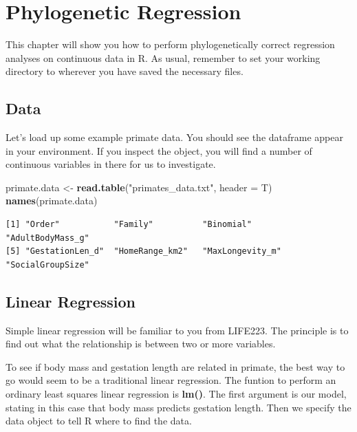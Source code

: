 \documentclass[
]{book}
\newenvironment{Shaded}{\begin{snugshade}}{\end{snugshade}}
\newcommand{\DataTypeTok}[1]{\textcolor[rgb]{0.13,0.29,0.53}{#1}}
\newcommand{\KeywordTok}[1]{\textcolor[rgb]{0.13,0.29,0.53}{\textbf{#1}}}
\newcommand{\NormalTok}[1]{#1}
\newcommand{\StringTok}[1]{\textcolor[rgb]{0.31,0.60,0.02}{#1}}
\begin{document}
\hypertarget{w2PGLS}{%
\chapter{Phylogenetic Regression}\label{w2PGLS}}

This chapter will show you how to perform phylogenetically correct regression analyses on continuous data in R. As usual, remember to set your working directory to wherever you have saved the necessary files.

\hypertarget{data-3}{%
\section{Data}\label{data-3}}

Let's load up some example primate data. You should see the dataframe appear in your environment. If you inspect the object, you will find a number of continuous variables in there for us to investigate.

\begin{Shaded}
\begin{Highlighting}[]
\NormalTok{primate.data \textless{}{-}}\StringTok{ }\KeywordTok{read.table}\NormalTok{(}\StringTok{"primates\_data.txt"}\NormalTok{, }\DataTypeTok{header =}\NormalTok{ T)}
\KeywordTok{names}\NormalTok{(primate.data)}
\end{Highlighting}
\end{Shaded}

\begin{verbatim}
[1] "Order"           "Family"          "Binomial"        "AdultBodyMass_g"
[5] "GestationLen_d"  "HomeRange_km2"   "MaxLongevity_m"  "SocialGroupSize"
\end{verbatim}

\hypertarget{linear-regression}{%
\section{Linear Regression}\label{linear-regression}}

Simple linear regression will be familiar to you from LIFE223. The principle is to find out what the relationship is between two or more variables.

To see if body mass and gestation length are related in primate, the best way to go would seem to be a traditional linear regression. The funtion to perform an ordinary least squares linear regression is \textbf{lm()}. The first argument is our model, stating in this case that body mass predicts gestation length. Then we specify the data object to tell R where to find the data.
\end{document}

